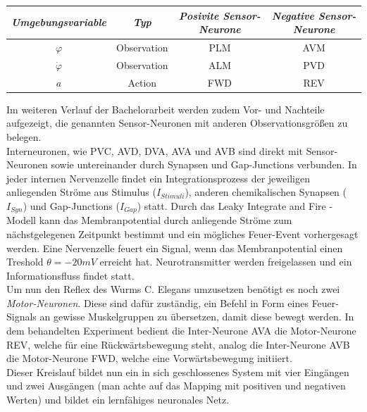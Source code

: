 	\begin{center}
	\begin{tabular}{c@{\hskip 0.5cm}c@{\hskip 0.5cm}c@{\hskip 0.5cm}c}    \toprule
		\setlength{\tabcolsep}{50pt}
		\renewcommand{\arraystretch}{1.5}
		\emph{Umgebungsvariable} & \emph{Typ}  & \emph{Posivite Sensor-Neurone} & \emph{Negative Sensor-Neurone} \\\midrule
		$\varphi$ 				 & Observation & PLM							& AVM							 \\ 
		$\dot{\varphi}$		 	 & Observation & ALM							& PVD							 \\
		$a$						 & Action	   & FWD							& REV							 \\\bottomrule
		\hline
	\end{tabular}
	\end{center}
	Im weiteren Verlauf der Bachelorarbeit werden zudem Vor- und Nachteile aufgezeigt, die genannten Sensor-Neuronen mit anderen Observationsgrößen zu belegen.\\
	Interneuronen, wie PVC, AVD, DVA, AVA und AVB sind direkt mit Sensor-Neuronen sowie untereinander durch Synapsen und Gap-Junctions verbunden. In jeder internen Nervenzelle findet ein Integrationsprozess der jeweiligen anliegenden Ströme aus Stimulus ($I_{Stimuli}$), anderen chemikalischen Synapsen ($I_{Syn}$) und Gap-Junctions ($I_{Gap}$) statt. Durch das Leaky Integrate and Fire - Modell kann das Membranpotential durch anliegende Ströme zum nächstgelegenen Zeitpunkt bestimmt und ein mögliches Feuer-Event vorhergesagt werden. Eine Nervenzelle feuert ein Signal, wenn das Membranpotential einen Treshold $\theta = -20mV$ erreicht hat. Neurotransmitter werden freigelassen und ein Informationsfluss findet statt.\\
	Um nun den Reflex des Wurms C. Elegans umzusetzen benötigt es noch zwei \textit{Motor-Neuronen}. Diese sind dafür zuständig, ein Befehl in Form eines Feuer-Signals an gewisse Muskelgruppen zu übersetzen, damit diese bewegt werden. In dem behandelten Experiment bedient die Inter-Neurone AVA die Motor-Neurone REV, welche für eine Rückwärtsbewegung steht, analog die Inter-Neurone AVB die Motor-Neurone FWD, welche eine Vorwärtsbewegung initiiert.\\
	Dieser Kreislauf bildet nun ein in sich geschlossenes System mit vier Eingängen und zwei Ausgängen (man achte auf das Mapping mit positiven und negativen Werten) und bildet ein lernfähiges neuronales Netz.
	


